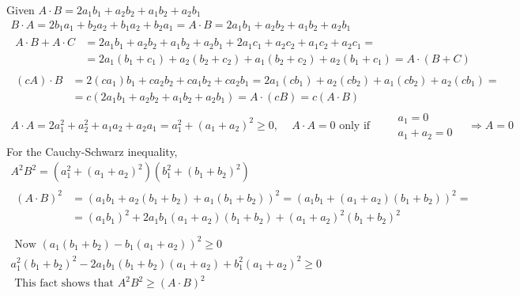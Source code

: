 \documentclass[twoside]{amsart}
\theoremstyle{plain}
\theoremstyle{definition}
\newcommand{\exercisehead}[1]
  {\smallskip
   \noindent{\small\bf Exercise #1.}}
\begin{document}
\exercisehead{15} Given $A\cdot B = 2a_1 b_1 + a_2 b_2 + a_1 b_2 + a_2 b_1 $
\[
\begin{gathered}
  B\cdot A = 2 b_1 a_1 + b_2 a_2 + b_1 a_2 + b_2 a_1 = A\cdot B = 2a_1 b_1 + a_2 b_2 + a_1 b_2 + a_2 b_1 \\
  \begin{aligned} 
    A\cdot B + A\cdot C & = 2a_1 b_1 + a_2 b_2 + a_1 b_2 + a_2 b_1 + 2a_1 c_1 + a_2 c_2 + a_1 c_2 + a_2 c_1 = \\
    &  = 2 a_1 (b_1 + c_1 ) + a_2 (b_2 +c_2) + a_1 (b_2 + c_2 ) + a_2 (b_1 +c_1) = A \cdot (B+C) 
  \end{aligned} \\
  \begin{aligned}
    (cA)\cdot B & = 2(ca_1)b_1 + ca_2 b_2 +ca_1 b_2 + ca_2 b_1 = 2a_1 (cb_1 ) + a_2 (cb_2) + a_1 (cb_2) + a_2 (cb_1) = \\
    & = c(2a_1 b_1 + a_2 b_2 + a_1 b_2 + a_2 b_1) = A \cdot (cB) = c(A\cdot B) 
\end{aligned} \\
  A\cdot A = 2a_1^2 + a_2^2 + a_1 a_2 + a_2 a_1 = a_1^2 + (a_1 + a_2)^2 \geq 0, \quad \, A\cdot A = 0 \text{ only if } \quad \begin{aligned}
    & a_1 = 0 \\
    & a_1 + a_2 = 0 
\end{aligned} \quad \Longrightarrow A = 0 
\end{gathered}
\]
For the Cauchy-Schwarz inequality, 
\[
\begin{gathered}
  A^2 B^2 = (a_1^2 + (a_1+a_2)^2 )(b_1^2 + (b_1+b_2)^2 ) \\
  \begin{aligned}
  (A\cdot B)^2 & = (a_1 b_1 +a_2(b_1 + b_2) + a_1(b_1+b_2))^2 = (a_1 b_1 + (a_1+a_2)(b_1+b_2))^2 = \\
    & = (a_1 b_1)^2 + 2a_1 b_1 (a_1 + a_2)(b_1+b_2) + (a_1+a_2)^2(b_1 +b_2)^2 
  \end{aligned} \\
  \quad \\
  \text{ Now } (a_1(b_1+b_2) - b_1(a_1+a_2))^2 \geq 0 \\
  a_1^2 (b_1+b_2)^2 - 2a_1 b_1(b_1+b_2)(a_1+a_2) + b_1^2 (a_1+a_2)^2 \geq 0 \\
  \text{ This fact shows that  } A^2 B^2 \geq (A\cdot B)^2 
\end{gathered}
\]
\end{document}
